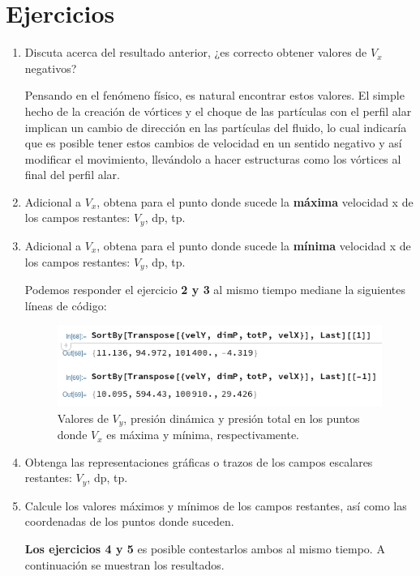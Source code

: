 \documentclass[12pt, letterpaper]{article}
\begin{document}
\section*{Ejercicios}
\begin{enumerate}
	\item Discuta acerca del resultado anterior, ¿es correcto obtener valores de $V_x$ negativos? 

		Pensando en el fenómeno físico, es natural encontrar estos valores. El simple hecho de la creación de vórtices y el choque de las partículas con el perfil alar implican un cambio de dirección en las partículas del fluido, lo cual indicaría que es posible tener estos cambios de velocidad en un sentido negativo y así modificar el movimiento, llevándolo a hacer estructuras como los vórtices al final del perfil alar.

	\item Adicional a $V_x$, obtena para el punto donde sucede la \textbf{máxima} velocidad x de los campos restantes: $V_y$, dp, tp.
	\item Adicional a $V_x$, obtena para el punto donde sucede la \textbf{mínima} velocidad x de los campos restantes: $V_y$, dp, tp.

		Podemos responder el ejercicio \textbf{2 y 3} al mismo tiempo mediane la siguientes líneas de código:

		\begin{figure}[H]
			\centering
			\includegraphics[width=\textwidth]{16.png}
			\caption{Valores de $V_y$, presión dinámica y presión total en los puntos donde $V_x$ es máxima y mínima, respectivamente.}
		\end{figure}

	\item Obtenga las representaciones gráficas o trazos de los campos escalares restantes: $V_y$, dp, tp.
	\item Calcule los valores máximos y mínimos de los campos restantes, así como las coordenadas de los puntos donde suceden.

		\textbf{Los ejercicios 4 y 5} es posible contestarlos ambos al mismo tiempo. A continuación se muestran los resultados.


\end{enumerate}
\end{document}
